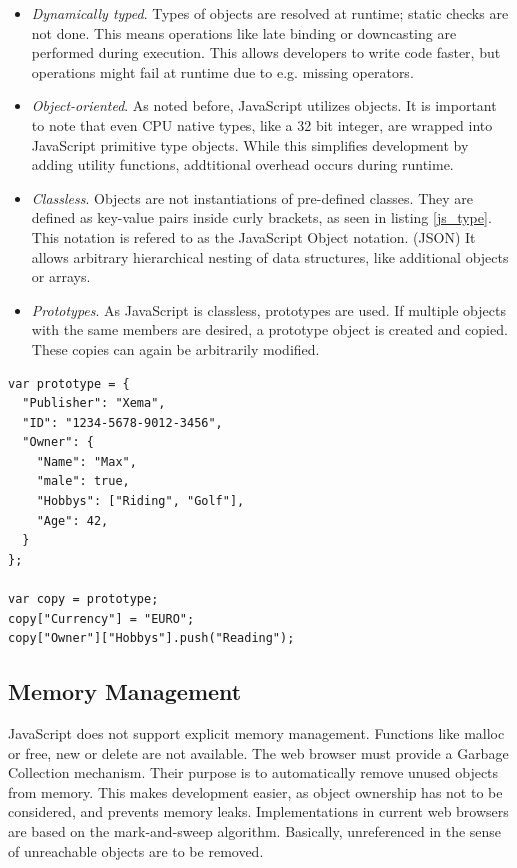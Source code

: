 \begin{itemize}

\item \textit{Dynamically typed}. Types of objects are resolved at runtime; static checks are not done. This means operations like late binding or downcasting are performed during execution. This allows developers to write code faster, but operations might fail at runtime due to e.g. missing operators.

\item \textit{Object-oriented}. As noted before, JavaScript utilizes objects. It is important to note that even CPU native types, like a 32 bit integer, are wrapped into JavaScript primitive type objects. While this simplifies development by adding utility functions, addtitional overhead occurs during runtime.

\item \textit{Classless}. Objects are not instantiations of pre-defined classes. They are defined as key-value pairs inside curly brackets, as seen in listing \ref{js_type}. This notation is refered to as the JavaScript Object notation. (JSON) It allows arbitrary hierarchical nesting of data structures, like additional objects or arrays.

\item \textit{Prototypes}. As JavaScript is classless, prototypes are used. If multiple objects with the same members are desired, a prototype object is created and copied. These copies can again be arbitrarily modified.

\end{itemize}

\begin{lstlisting}[frame=single]
var prototype = {
  "Publisher": "Xema",
  "ID": "1234-5678-9012-3456",
  "Owner": {
    "Name": "Max",
    "male": true,
    "Hobbys": ["Riding", "Golf"],
    "Age": 42,
  }
};

var copy = prototype;
copy["Currency"] = "EURO";
copy["Owner"]["Hobbys"].push("Reading");
\end{lstlisting}


\subsection{Memory Management}

JavaScript does not support explicit memory management. Functions like malloc or free, new or delete are not available. The web browser must provide a Garbage Collection mechanism. Their purpose is to automatically remove unused objects from memory. This makes development easier, as object ownership has not to be considered, and prevents memory leaks. Implementations in current web browsers are based on the mark-and-sweep algorithm. Basically, unreferenced in the sense of unreachable objects are to be removed. 

